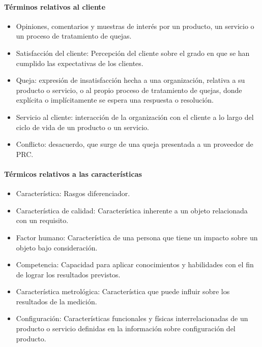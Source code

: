 					\paragraph{Términos relativos al cliente}
						\begin{itemize}
							\item Opiniones, comentarios y muestras de interés por un producto, un
							servicio o un proceso de tratamiento de quejas.
							
							\item Satisfacción del cliente: Percepción del cliente sobre el grado en que se han cumplido las expectativas de los clientes.
							
							\item Queja: expresión de insatisfacción hecha a una organización, relativa a
							su producto o servicio, o al propio proceso de tratamiento de quejas, donde
							explícita o implícitamente se espera una respuesta o resolución.
							
							\item Servicio al cliente: interacción de la organización con el cliente a lo largo del ciclo de vida de un producto o un servicio.
							
							\item Conflicto: desacuerdo, que surge de una queja presentada a un proveedor de PRC. 
						\end{itemize}
					
					\paragraph{Térmicos relativos a las características}
						\begin{itemize}
							\item Característica: Rasgos diferenciador.
							
							\item Característica de calidad: Característica inherente a un objeto relacionada con un requisito.
							
							\item Factor humano: Característica de una persona que tiene un impacto sobre un objeto bajo consideración.
							
							\item Competencia: Capacidad para aplicar conocimientos y habilidades con el fin de lograr los resultados previstos.
							
							\item Característica metrológica: Característica que puede influir sobre los resultados de la medición.
							
							\newpage
							\thispagestyle{plain}
							
							\item Configuración: Características funcionales y físicas interrelacionadas de un producto o servicio
							definidas en la información sobre configuración del producto.
						\end{itemize}
					
